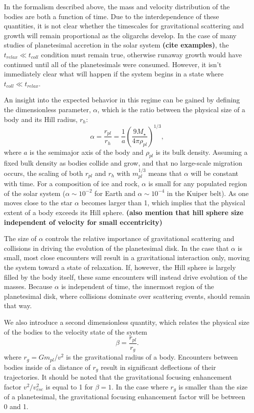 \documentclass[twocolumn]{aastex63}
\begin{document}
In the formalism described above, the mass and velocity distribution
of the bodies are both a function of time. Due to the interdependence
of these quantities, it is not clear whether the timescales for
gravitational scattering and growth will remain proportional as the
oligarchs develop. In the case of many studies of planetesimal
accretion in the solar system
{\bf(cite examples)}, the $t_{relax} \ll t_{coll}$ condition must remain true, otherwise runaway growth would have continued until all of the planetesimals were consumed. However, it isn't immediately clear what will happen if the system begins in a state where $t_{coll} \ll t_{relax}$.

An insight into the expected behavior in this regime can be gained by
defining the dimensionless parameter, $\alpha$, which is the ratio
between the physical size of a body and its Hill radius, $r_{h}$:
\begin{equation}\label{eq:alpha}
	\alpha = \frac{r_{pl}}{r_{h}} = \frac{1}{a} \left( \frac{9 M_{\star}}{4 \pi \rho_{pl}} \right)^{1/3},
\end{equation}
where $a$ is the semimajor axis of the body and $\rho_{pl}$ is its
bulk density. Assuming a fixed bulk density as bodies collide and
grow, and that no large-scale migration occurs, the scaling of both
$r_{pl}$ and $r_{h}$ with $m_{pl}^{1/3}$ means that $\alpha$ will be
constant with time. For a composition of ice and rock, $\alpha$ is
small for any populated region of the solar system ($\alpha \sim
10^{-2}$ for Earth and $\alpha \sim 10^{-4}$ in the Kuiper belt). As
one moves close to the star $\alpha$ becomes larger than 1, which
implies that the physical extent of a body exceeds its Hill sphere.
{\bf(also mention that hill sphere size independent of velocity for small eccentricity)}

The size of $\alpha$ controls the relative importance of gravitational scattering and collisions in driving the evolution of the planetesimal disk. In the case that $\alpha$ is small, most close encounters will result in a gravitational interaction only, moving the system toward a state of relaxation. If, however, the Hill sphere is largely filled by the body itself, these same encounters will instead drive evolution of the masses. Because $\alpha$ is independent of time, the innermost region of the planetesimal disk, where collisions dominate over scattering events, should remain that way.

We also introduce a second dimensionless quantity, which relates the physical size of the bodies to the velocity state of the system
\begin{equation}\label{eq:beta}
	\beta = \frac{r_{pl}}{r_{g}}.
\end{equation}
where $r_{g} = G m_{pl} / v^{2}$ is the gravitational radius of a body. Encounters between bodies inside of a distance of $r_{g}$ result in significant deflections of their trajectories. It should be noted that the gravitational focusing enhancement factor $v^{2}/v_{esc}^{2}$ is equal to 1 for $\beta = 1$. In the case where $r_{g}$ is smaller than the size of a planetesimal, the gravitational focusing enhancement factor will be between 0 and 1.
\end{document}
